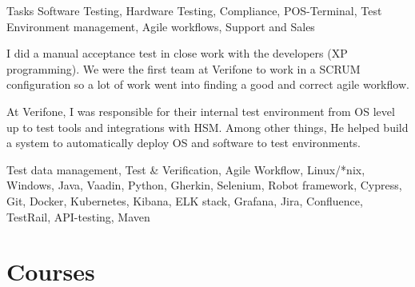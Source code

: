 \documentclass{sobCV}[2015/09/08]
\begin{document}
   {Tasks}{
       Software Testing,
       Hardware Testing,
       Compliance, 
       POS-Terminal,
       Test Environment management,
       Agile workflows,
       Support and Sales
 }{  %
      {
          I did a manual acceptance test in close work with the developers (XP
          programming). We were the first team at Verifone to work in a SCRUM
          configuration so a lot of work went into finding a good and correct
          agile workflow.

          At Verifone, I was responsible for their internal test environment
          from OS level up to test tools and integrations with HSM. Among other
          things, He helped build a system to automatically deploy OS and
          software to test environments.
     }
 }{
       Test data management,
       Test \& Verification,
       Agile Workflow, 
       Linux/*nix, 
       Windows, 
       Java, 
       Vaadin, 
       Python, 
       Gherkin, 
       Selenium, 
       Robot framework,
       Cypress, 
       Git, 
       Docker, 
       Kubernetes, 
       Kibana, 
       ELK stack, 
       Grafana, 
       Jira, 
       Confluence, 
       TestRail, 
       API-testing, 
       Maven 
}
   \section{Courses}

   
   
\end{document}
